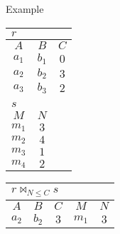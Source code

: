 \begin{multicols}{2}
\begin{CheatsheetEntryFrame}
        \SubsectionFrameAddSeparation
        \begin{RelAlgSubsection}{Example}
        \begin{center}
            {\footnotesize%
                \begin{tabular}{|ccc|}
                    \multicolumn{3}{l}{\normalsize $r$}
                        \\ \hline
                    \multicolumn{1}{|c}{$A$}
                        & \multicolumn{1}{c}{$B$}
                        & \multicolumn{1}{c|}{$C$}
                        \\ \hline\hline
                    $a_1$ & $b_1$ & $0$ \\
                    $a_2$ & $b_2$ & $3$ \\
                    $a_3$ & $b_3$ & $2$ \\ \hline
                    \multicolumn{3}{c}{} \\ %
                    \multicolumn{3}{l}{\normalsize $s$}
                        \\ \cline{1-2}
                    \multicolumn{1}{|c}{$M$}
                        & \multicolumn{1}{c|}{$N$}
                        & \multicolumn{1}{c}{} %
                    \\ \cline{1-2} \cline{1-2}
                        $m_1$ & \multicolumn{1}{c|}{$3$} & \multicolumn{1}{c}{} \\
                        $m_2$ & \multicolumn{1}{c|}{$4$} & \multicolumn{1}{c}{} \\
                        $m_3$ & \multicolumn{1}{c|}{$1$} & \multicolumn{1}{c}{} \\
                        $m_4$ & \multicolumn{1}{c|}{$2$} & \multicolumn{1}{c}{} \\ \cline{1-2}
                \end{tabular}
                \qquad
                \begin{tabular}{|ccccc|}
                    \multicolumn{5}{l}{\normalsize $r \bowtie_{N \le C} s$}
                        \\ \hline
                    \multicolumn{1}{|c}{$A$}
                        & \multicolumn{1}{c}{$B$}
                        & \multicolumn{1}{c}{$C$}
                        & \multicolumn{1}{c}{$M$}
                        & \multicolumn{1}{c|}{$N$}
                        \\ \hline\hline
                    $a_2$ & $b_2$ & $3$ & $m_1$ & $3$ \\

\end{tabular}}
\end{center}
\end{RelAlgSubsection}
\end{CheatsheetEntryFrame}
\end{multicols}
